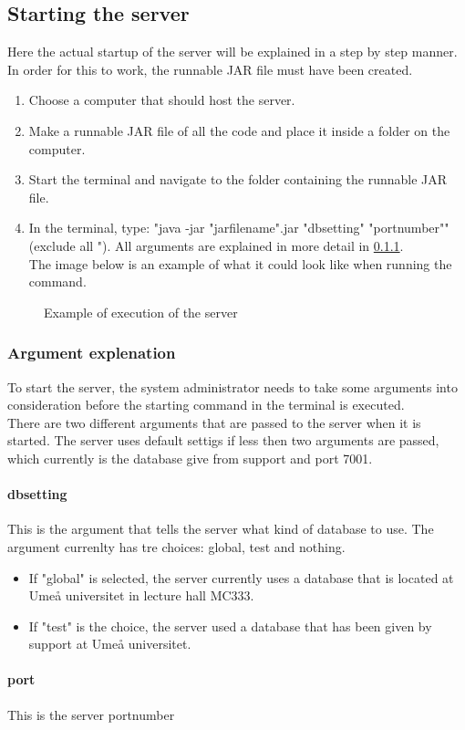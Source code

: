 \subsection{Starting the server}
Here the actual startup of the server will be explained in a step by step manner.
In order for this to work, the runnable JAR file must have been created.
\begin{enumerate}
\item Choose a computer that should host the server.
\item Make a runnable JAR file of all the code and place it inside a folder on the computer.
\item Start the terminal and navigate to the folder containing the runnable JAR file.
\item In the terminal, type: "java -jar "jarfilename".jar "dbsetting" "portnumber"" (exclude all "). All arguments are explained in more detail in \ref{sec:com_ArgExpl}.\\ 
The image  below is an example of what it could look like when running the command. 
\end{enumerate}
\begin{figure}[h]
\caption{Example of execution of the server}
\label{fig:com_runserverterminal}
\end{figure}

\subsubsection{Argument explenation}
\label{sec:com_ArgExpl}
To start the server, the system administrator needs to take some arguments into consideration before the starting command in the terminal is executed.\\
There are two different arguments that are passed to the server when it is started.
The server uses default settigs if less then two arguments are passed, which currently is the database give from support and port 7001.

\paragraph{dbsetting}
This is the argument that tells the server what kind of database to use.
The argument currenlty has tre choices: global, test and nothing. 

\begin{itemize}
\item If "global" is selected, the server currently uses a database that is located at Umeå universitet in lecture hall MC333.
\item If "test" is the choice, the server used a database that has been given by support at Umeå universitet. 
\end{itemize}

\paragraph{port}
This is the server portnumber